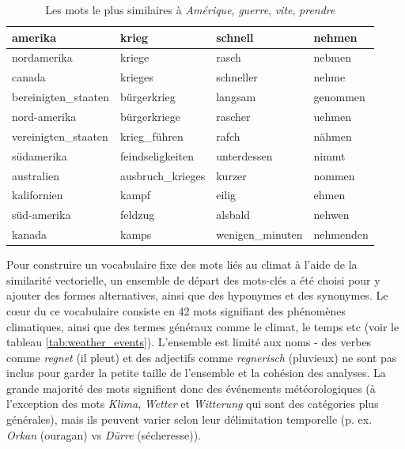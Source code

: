 \documentclass[a4paper,twoside,12pt]{article}
\begin{document}
\begin{table}[h]
    \centering
    \small
    \begin{tabular}{llll}
\toprule
            \textbf{amerika} &            \textbf{krieg} &         \textbf{schnell} &    \textbf{nehmen} \\
\midrule
        nordamerika &           kriege &           rasch &    nebmen \\
             canada &          krieges &       schneller &     nehme \\
bereinigten\_staaten &      bürgerkrieg &         langsam &  genommen \\
       nord-amerika &     bürgerkriege &         rascher &    uehmen \\
vereinigten\_staaten &     krieg\_führen &           rafch &    nähmen \\
         südamerika & feindseligkeiten &     unterdessen &     nimmt \\
         australien & ausbruch\_krieges &          kurzer &    nommen \\
        kalifornien &            kampf &           eilig &     ehmen \\
        süd-amerika &          feldzug &         alsbald &    nehwen \\
             kanada &            kamps & wenigen\_minuten & nehmenden \\
\bottomrule
\end{tabular}
    \caption{Les mots le plus similaires à \textit{Amérique}, \textit{guerre}, \textit{vite}, \textit{prendre}}
    \label{tab:similar_vectors}
\end{table}

Pour construire un vocabulaire fixe des mots liés au climat à l'aide de la similarité vectorielle, un ensemble de départ des mots-clés a été choisi pour y ajouter des formes alternatives, ainsi que des hyponymes et des synonymes. Le cœur du ce vocabulaire consiste en 42 mots signifiant des phénomènes climatiques, ainsi que des termes généraux comme le climat, le temps etc (voir le tableau \ref{tab:weather_events}). L'ensemble est limité aux noms - des verbes comme \textit{regnet} (il pleut) et des adjectifs comme \textit{regnerisch} (pluvieux) ne sont pas inclus pour garder la petite taille de l'ensemble et la cohésion des analyses. La grande majorité des mots signifient donc des événements météorologiques (à l'exception des mots \textit{Klima}, \textit{Wetter} et \textit{Witterung} qui sont des catégories plus générales), mais ils peuvent varier selon leur délimitation temporelle (p. ex. \textit{Orkan} (ouragan) vs \textit{Dürre} (sécheresse)).
\end{document}
